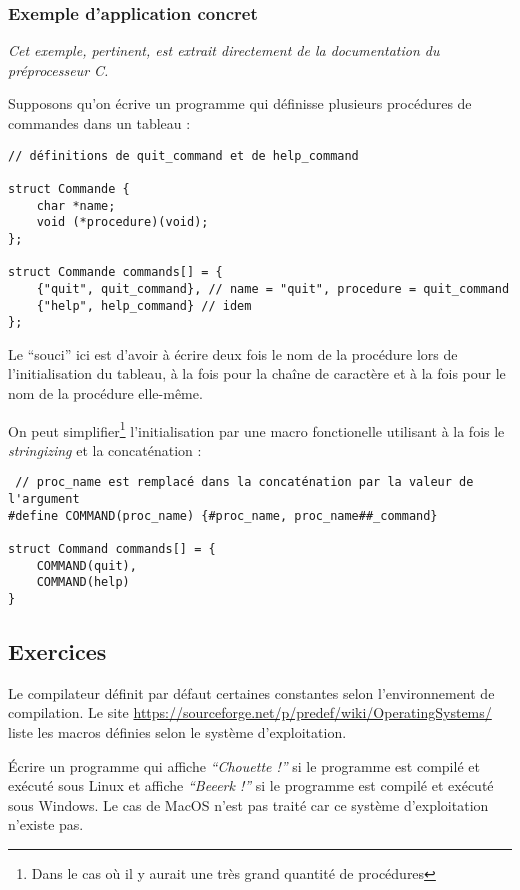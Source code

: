 \documentclass[../../../main.tex]{subfiles}
\begin{document}
\subsubsection{Exemple d'application concret}
\textit{Cet exemple, pertinent, est extrait directement de la documentation du préprocesseur C.}

Supposons qu'on écrive un programme qui définisse plusieurs procédures de commandes dans un tableau :
\begin{verbatim}
// définitions de quit_command et de help_command

struct Commande {
	char *name;
	void (*procedure)(void);
};

struct Commande commands[] = {
	{"quit", quit_command}, // name = "quit", procedure = quit_command
	{"help", help_command} // idem
};
\end{verbatim}
Le ``souci'' ici est d'avoir à écrire deux fois le nom de la procédure lors de l'initialisation du tableau, à la fois pour la chaîne de caractère et à la fois pour le nom de la procédure elle-même.

On peut simplifier\footnote{Dans le cas où il y aurait une très grand quantité de procédures} l'initialisation par une macro fonctionelle utilisant à la fois le \textit{stringizing} et la concaténation :
\begin{verbatim}
 // proc_name est remplacé dans la concaténation par la valeur de l'argument
#define COMMAND(proc_name) {#proc_name, proc_name##_command}

struct Command commands[] = {
	COMMAND(quit),
	COMMAND(help)
}
\end{verbatim}
\subsection{Exercices}
Le compilateur définit par défaut certaines constantes selon l'environnement de compilation. Le site \url{https://sourceforge.net/p/predef/wiki/OperatingSystems/} liste les macros définies selon le système d'exploitation.

Écrire un programme qui affiche \textit{``Chouette !''} si le programme est compilé et exécuté sous Linux et affiche \textit{``Beeerk !''} si le programme est compilé et exécuté sous Windows. Le cas de MacOS n'est pas traité car ce système d'exploitation n'existe pas.
\end{document}
